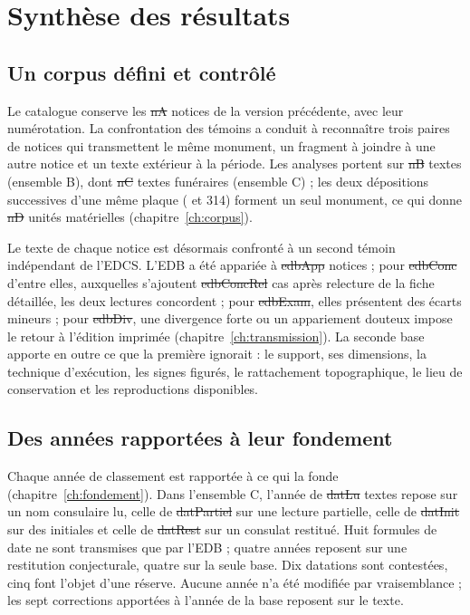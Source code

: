 \chapter{Synthèse des résultats}\label{ch:synthese}

\section{Un corpus défini et contrôlé}

Le catalogue conserve les \st{nA} notices de la version précédente, avec leur numérotation. La confrontation des témoins a conduit à reconnaître trois paires de notices qui transmettent le même monument, un fragment à joindre à une autre notice et un texte extérieur à la période. Les analyses portent sur \st{nB} textes (ensemble B), dont \st{nC} textes funéraires (ensemble C) ; les deux dépositions successives d’une même plaque ( et 314) forment un seul monument, ce qui donne \st{nD} unités matérielles (chapitre~\ref{ch:corpus}).

Le texte de chaque notice est désormais confronté à un second témoin indépendant de l’EDCS. L’EDB a été appariée à \st{edbApp} notices ; pour \st{edbConc} d’entre elles, auxquelles s’ajoutent \st{edbConcRel} cas après relecture de la fiche détaillée, les deux lectures concordent ; pour \st{edbExam}, elles présentent des écarts mineurs ; pour \st{edbDiv}, une divergence forte ou un appariement douteux impose le retour à l’édition imprimée (chapitre~\ref{ch:transmission}). La seconde base apporte en outre ce que la première ignorait : le support, ses dimensions, la technique d’exécution, les signes figurés, le rattachement topographique, le lieu de conservation et les reproductions disponibles.

\section{Des années rapportées à leur fondement}

Chaque année de classement est rapportée à ce qui la fonde (chapitre~\ref{ch:fondement}). Dans l’ensemble C, l’année de \st{datLu} textes repose sur un nom consulaire lu, celle de \st{datPartiel} sur une lecture partielle, celle de \st{datInit} sur des initiales et celle de \st{datRest} sur un consulat restitué. Huit formules de date ne sont transmises que par l’EDB ; quatre années reposent sur une restitution conjecturale, quatre sur la seule base. Dix datations sont contestées, cinq font l’objet d’une réserve. Aucune année n’a été modifiée par vraisemblance ; les sept corrections apportées à l’année de la base reposent sur le texte.

